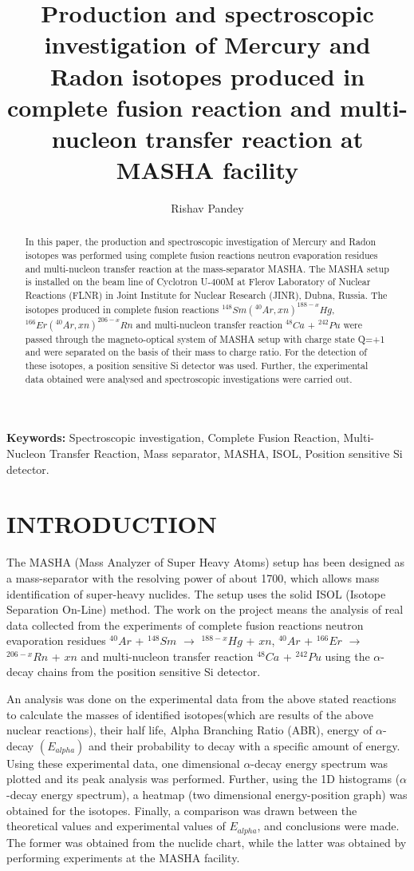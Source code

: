 \documentclass[12pt]{article}
\title{\large \textbf{Production and spectroscopic investigation of Mercury and Radon isotopes produced in complete fusion reaction and multi-nucleon transfer reaction at MASHA facility}}
\author[1,a)]{Rishav Pandey}
\affil[1]{Senior, Department of Electronics and Tele-Communication Engineering, Jabalpur Engineering College, Jabalpur-482011, India.}
\affil[a)]{Corresponding author: rishav160999@gmail.com}
\date{}
\providecommand{\keywords}{\small\textbf{Keywords: }}
\begin{document}
\maketitle

\begin{abstract}
In this paper, the production and spectroscopic investigation of Mercury and Radon isotopes was performed using complete fusion reactions neutron evaporation residues and multi-nucleon transfer reaction at the mass-separator MASHA. The MASHA setup is installed on the beam line of Cyclotron U-400M at Flerov Laboratory of Nuclear Reactions (FLNR) in Joint Institute for Nuclear Research (JINR), Dubna, Russia. The isotopes produced in complete fusion reactions $^{148}Sm(^{40}Ar,xn)^{188-x}Hg$, $^{166}Er(^{40}Ar,xn)^{206-x}Rn$ and multi-nucleon transfer reaction $^{48}Ca$ + $^{242}Pu$ were passed through the magneto-optical system of MASHA setup with charge state Q=+1 and were separated on the basis of their mass to charge ratio. For the detection of these isotopes, a position sensitive Si detector was used. Further, the experimental data obtained were analysed and spectroscopic investigations were carried out.
\end{abstract}

\keywords{Spectroscopic investigation, Complete Fusion Reaction, Multi-Nucleon Transfer Reaction, Mass separator, MASHA, ISOL, Position sensitive Si detector.}

\section{INTRODUCTION}
The MASHA (Mass Analyzer of Super Heavy Atoms) setup has been designed as a mass-separator with the resolving power of about 1700, which allows mass identification of super-heavy nuclides. The setup uses the solid ISOL (Isotope Separation On-Line) method. The work on the project means the analysis of real data collected from the experiments of complete fusion reactions neutron evaporation residues $^{40}Ar$ + $^{148}Sm$ $\rightarrow$ $^{188-x}Hg$ + $xn$, $^{40}Ar$ + $^{166}Er$ $\rightarrow$ $^{206-x}Rn$ + $xn$  and multi-nucleon transfer reaction $^{48}Ca$ + $^{242}Pu$ using the $\alpha$-decay chains from the position sensitive Si detector.

An analysis was done on the experimental data from the above stated reactions to calculate the masses of identified isotopes(which are results of the above nuclear reactions), their half life, Alpha Branching Ratio (ABR), energy of $\alpha$-decay $(E_{alpha})$ and their probability to decay with a specific amount of energy. Using these experimental data, one dimensional $\alpha$-decay energy spectrum was plotted and its peak analysis was performed. Further, using the 1D histograms ($\alpha$-decay energy spectrum), a heatmap (two dimensional energy-position graph) was obtained for the isotopes. Finally, a comparison was drawn between the theoretical values and experimental values of $E_{alpha}$, and conclusions were made. The former was obtained from the nuclide chart, while the latter was obtained by performing experiments at the MASHA facility.
\end{document}
